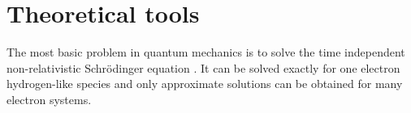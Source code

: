 \section{Theoretical tools}
The most basic problem in quantum mechanics is to solve the time independent
non-relativistic Schr\"odinger equation \cite{Schrodinger26}.
It can be solved exactly for one electron hydrogen-like species and only approximate
solutions can be obtained for many electron systems.
